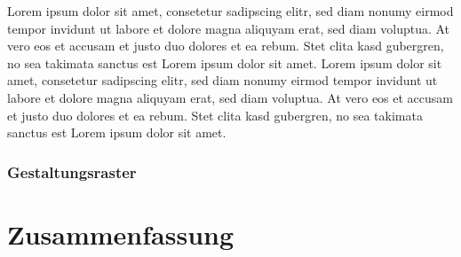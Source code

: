 \documentclass[12pt,a4paper]{article}
\begin{document}
Lorem ipsum dolor sit amet, consetetur sadipscing elitr, sed diam nonumy eirmod tempor invidunt ut labore et dolore magna aliquyam erat, sed diam voluptua. At vero eos et accusam et justo duo dolores et ea rebum. Stet clita kasd gubergren, no sea takimata sanctus est Lorem ipsum dolor sit amet. Lorem ipsum dolor sit amet, consetetur sadipscing elitr, sed diam nonumy eirmod tempor invidunt ut labore et dolore magna aliquyam erat, sed diam voluptua. At vero eos et accusam et justo duo dolores et ea rebum. Stet clita kasd gubergren, no sea takimata sanctus est Lorem ipsum dolor sit amet.

\subsubsection{Gestaltungsraster}

\newpage
\section{Zusammenfassung}

\newpage
\listoffigures

\newpage
\nocite{proCG}
\nocite{perspectivesOnProGeo}
\nocite{doppelVerhaeltnis}
\nocite{proGeoGrundlagen}


\end{document}
